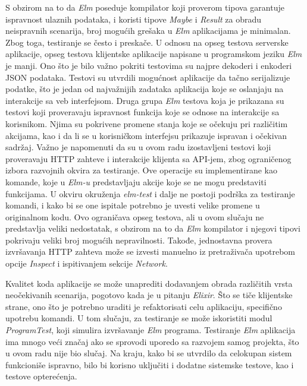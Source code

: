 \documentclass[12pt,oneside]{memoir}
\begin{document}
\par S obzirom na to da \emph{Elm} poseduje kompilator koji proverom tipova garantuje ispravnost ulaznih podataka, i koristi tipove \emph{Maybe} i \emph{Result} za obradu neispravnih scenarija, broj mogućih grešaka u \emph{Elm} aplikacijama je minimalan. Zbog toga, testiranje se često i preskače. U odnosu na opseg testova serverske aplikacije, opseg testova klijentske aplikacije napisane u programskom jeziku \emph{Elm} je manji. Ono što je bilo važno pokriti testovima su najpre dekoderi i enkoderi JSON podataka. Testovi su utvrdili mogućnost aplikacije da tačno serijalizuje podatke, što je jedan od najvažnijih zadataka aplikacija koje se oslanjaju na interakcije sa veb interfejsom. Druga grupa \emph{Elm} testova koja je prikazana su testovi koji proveravaju ispravnost funkcija koje se odnose na interakcije sa korisnikom. Njima su pokrivene promene stanja koje se očekuju pri različitim akcijama, kao i da li se u korisničkom interfejsu prikazuje ispravan i očekivan sadržaj. Važno je napomenuti da su u ovom radu izostavljeni testovi koji proveravaju HTTP zahteve i interakcije klijenta sa API-jem, zbog ograničenog izbora razvojnih okvira za testiranje. Ove operacije su implementirane kao komande, koje u \emph{Elm-u} predstavljaju akcije koje se ne mogu predstaviti funkcijama. U okviru okruženja \emph{elm-test} i dalje ne postoji podrška za testiranje komandi, i kako bi se one ispitale potrebno je uvesti velike promene u originalnom kodu. Ovo ograničava opseg testova, ali u ovom slučaju ne predstavlja veliki nedostatak, s obzirom na to da \emph{Elm} kompilator i njegovi tipovi pokrivaju veliki broj mogućih nepravilnosti. Takođe, jednostavna provera izvršavanja HTTP zahteva može se izvesti manuelno iz pretraživača upotrebom opcije \emph{Inspect} i ispitivanjem sekcije \emph{Network}. 
\par Kvalitet koda aplikacije se može unaprediti dodavanjem obrada različitih vrsta neočekivanih scenarija, pogotovo kada je u pitanju \emph{Elixir}. Što se tiče klijentske strane, ono što je potrebno uraditi je refaktorisati celu aplikaciju, specifično upotrebu komandi. U tom slučaju, za testiranje se može iskoristiti modul \emph{ProgramTest}, koji simulira izvršavanje \emph{Elm} programa. Testiranje \emph{Elm} aplikacija ima mnogo veći značaj ako se sprovodi uporedo sa razvojem samog projekta, što u ovom radu nije bio slučaj. Na kraju, kako bi se utvrdilo da celokupan sistem funkcioniše ispravno, bilo bi korisno uključiti i dodatne sistemske testove, kao i testove opterećenja.
\end{document}
